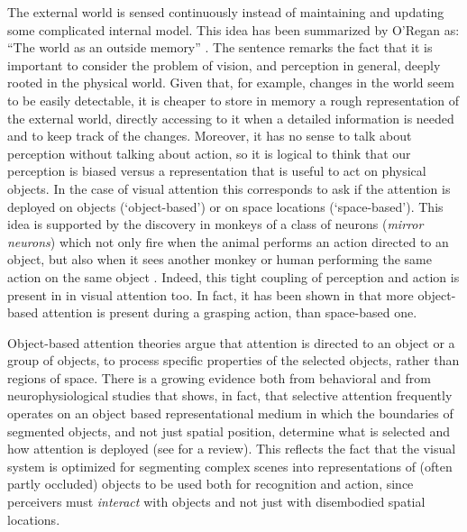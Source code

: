 \documentclass{llncs}
\begin{document}
The external world is sensed
continuously instead of maintaining and updating some
complicated internal model.
This idea has been summarized by O'Regan as:
``The world as an outside memory'' \cite{ORegan92}.
The sentence remarks the fact that it is important
to consider the problem of vision, and perception in general,
deeply rooted in the physical world. Given that, for example,
changes in the world seem to be easily detectable, it
is cheaper to store in memory a rough representation of
the external world, directly accessing to it when a
detailed information is needed and to keep track of the changes.
Moreover, it has no sense to talk about perception without
talking about action, so it is logical to
think that our perception is biased versus a representation
that is useful to act on physical objects.
In the case of visual attention this corresponds to ask
if the attention is deployed on objects (`object-based') or
on space locations (`space-based').
This idea is supported by the discovery in monkeys of a
class of neurons (\emph{mirror neurons}) which not only
fire when the animal performs an action directed to an
object, but also when it sees another monkey or human performing the
same action on the same object \cite{FadigaFGR00}.
Indeed, this tight coupling of perception and action is present in
in visual attention too. In fact, it has been shown in \cite{FischerH04}
that more object-based attention is present during a grasping action, than
space-based one.


Object-based attention theories
argue that attention is directed to an object or a group
of objects, to process specific properties of the selected
objects, rather than regions of space. There is a
growing evidence both from behavioral and from
neurophysiological studies that shows, in fact, that
selective attention frequently operates on an object based
representational medium in which the
boundaries of segmented objects, and not just spatial
position, determine what is selected and how attention
is deployed (see \cite{Scholl01} for a review). This reflects the fact
that the visual system is optimized for segmenting
complex scenes into representations of (often partly
occluded) objects to be used both for recognition and
action, since perceivers must \emph{interact} with objects and
not just with disembodied spatial locations.
\end{document}
